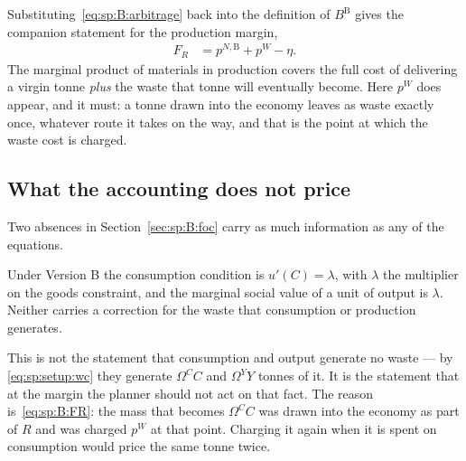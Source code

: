 Substituting~\eqref{eq:sp:B:arbitrage} back into the definition of $B^{\mathrm B}$ gives the companion statement
for the production margin,
\begin{align}
F_R &= p^{N,\mathrm B}+p^W-\eta .
\label{eq:sp:B:FR}
\end{align}
The marginal product of materials in production covers the full cost of delivering a virgin tonne
\emph{plus} the waste that tonne will eventually become. Here $p^W$ does appear, and it must: a tonne
drawn into the economy leaves as waste exactly once, whatever route it takes on the way, and that is
the point at which the waste cost is charged.


\subsection{What the accounting does not price}\label{sec:sp:B:nowedge}

Two absences in Section~\ref{sec:sp:B:foc} carry as much information as any of the equations.

\begin{proposition}\label{prop:sp:B:nowedge}
Under Version B the consumption condition is $u'(C)=\lambda$, with $\lambda$ the multiplier on the goods
constraint, and the marginal social value of a unit of output is $\lambda$. Neither carries a correction
for the waste that consumption or production generates.
\end{proposition}

This is not the statement that consumption and output generate no waste --- by \eqref{eq:sp:setup:wc}
they generate $\Omega^CC$ and $\Omega^YY$ tonnes of it. It is the statement that at the margin the
planner should not act on that fact. The reason is~\eqref{eq:sp:B:FR}: the mass that becomes
$\Omega^CC$ was drawn into the economy as part of $R$ and was charged $p^W$ at that point. Charging it
again when it is spent on consumption would price the same tonne twice.

